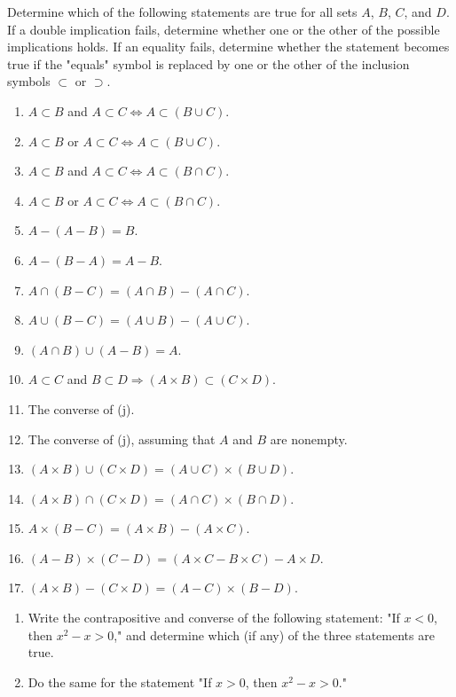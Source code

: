   \begin{exercise}[Munkres 1.2]
    Determine which of the following statements are true for all sets $A$, $B$, $C$, and $D$. If a double implication fails, determine whether one or the other of the possible implications holds. If an equality fails, determine whether the statement becomes true if the "equals" symbol is replaced by one or the other of the inclusion symbols $\subset$ or $\supset$.
    \begin{enumerate}
      \item $A \subset B$ and $A \subset C \iff A \subset (B \cup C)$.
      \item $A \subset B$ or $A \subset C \iff A \subset (B \cup C)$.
      \item $A \subset B$ and $A \subset C \iff A \subset (B \cap C)$.
      \item $A \subset B$ or $A \subset C \iff A \subset (B \cap C)$.
      \item $A - (A - B) = B$.
      \item $A - (B - A) = A - B$.
      \item $A \cap (B - C) = (A \cap B) - (A \cap C)$.
      \item $A \cup (B - C) = (A \cup B) - (A \cup C)$.
      \item $(A \cap B) \cup (A - B) = A$.
      \item $A \subset C$ and $B \subset D \Rightarrow (A \times B) \subset (C \times D)$.
      \item The converse of (j).
      \item The converse of (j), assuming that $A$ and $B$ are nonempty.
      \item $(A \times B) \cup (C \times D) = (A \cup C) \times (B \cup D)$.
      \item $(A \times B) \cap (C \times D) = (A \cap C) \times (B \cap D)$.
      \item $A \times (B - C) = (A \times B) - (A \times C)$.
      \item $(A - B) \times (C - D) = (A \times C - B \times C) - A \times D$.
      \item $(A \times B) - (C \times D) = (A - C) \times (B - D)$.
    \end{enumerate}
  \end{exercise}
  \begin{solution}
    
  \end{solution}

  \begin{exercise}[Munkres 1.3]
    \begin{enumerate}
      \item Write the contrapositive and converse of the following statement: "If $x < 0$, then $x^2 - x > 0$," and determine which (if any) of the three statements are true.
      \item Do the same for the statement "If $x > 0$, then $x^2 - x > 0$."
    \end{enumerate}
  \end{exercise}
  \begin{solution}
    
  \end{solution}

